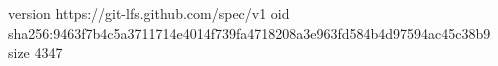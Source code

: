 version https://git-lfs.github.com/spec/v1
oid sha256:9463f7b4c5a3711714e4014f739fa4718208a3e963fd584b4d97594ac45c38b9
size 4347
